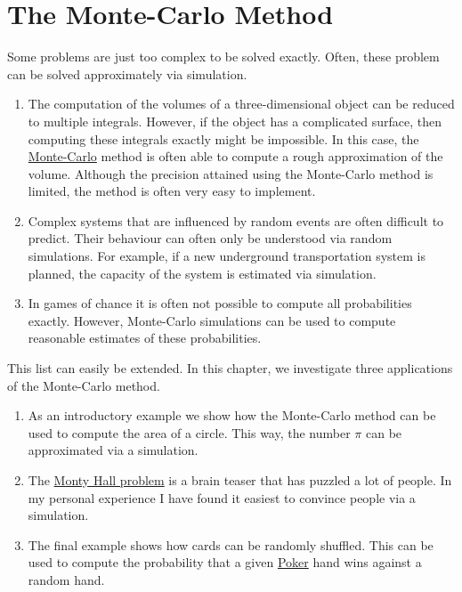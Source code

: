\chapter{The Monte-Carlo Method}
Some problems are just too complex to be solved exactly.  Often, these problem can be solved approximately via simulation.
\begin{enumerate}
\item The computation of the volumes of a three-dimensional object can be reduced to multiple integrals.
      However, if the object has a complicated surface, then computing these integrals exactly might be impossible.
      In this case, the \href{https://en.wikipedia.org/wiki/Monte_Carlo_integration}{Monte-Carlo} method is
      often able to compute a rough approximation of the volume.  Although the precision attained using the Monte-Carlo
      method is limited, the method is often very easy to implement.
\item Complex systems that are influenced by random events are often difficult to predict.  Their behaviour can
      often only be understood via random simulations.  For example, if a new underground transportation system
      is planned, the capacity of the system is estimated via simulation.
\item In games of chance it is often not possible to compute all probabilities exactly.  However, Monte-Carlo
      simulations can be used to compute reasonable estimates of these probabilities.
\end{enumerate}
This list can easily be extended.  In this chapter, we investigate three applications of the Monte-Carlo method.
\begin{enumerate}
\item As an introductory example we show how the Monte-Carlo method can be used to compute the area of a
      circle.  This way, the number \href{https://en.wikipedia.org/wiki/Pi}{$\pi$} can be approximated via a simulation.
\item The \href{https://en.wikipedia.org/wiki/Monty_Hall_problem}{Monty Hall problem} is a brain teaser that
      has puzzled a lot of people.  In my personal experience I have found it easiest to convince people via
      a simulation.
\item The final example shows how cards can be randomly shuffled.  This can be used to compute the probability
      that a given \href{https://en.wikipedia.org/wiki/Poker}{Poker} hand wins against a random hand.
\end{enumerate}

